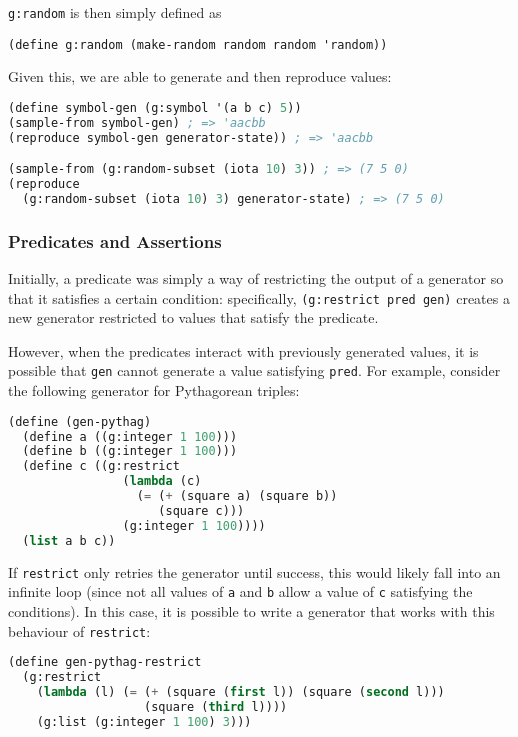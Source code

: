 \verb|g:random| is then simply defined as
\begin{lstlisting}
(define g:random (make-random random random 'random))
\end{lstlisting}

Given this, we are able to generate and then reproduce values:

\begin{lstlisting}[language=lisp]
(define symbol-gen (g:symbol '(a b c) 5))
(sample-from symbol-gen) ; => 'aacbb
(reproduce symbol-gen generator-state)) ; => 'aacbb

(sample-from (g:random-subset (iota 10) 3)) ; => (7 5 0)
(reproduce 
  (g:random-subset (iota 10) 3) generator-state) ; => (7 5 0)
\end{lstlisting}

\subsubsection{Predicates and Assertions}

Initially, a predicate was simply a way of restricting the output of a generator so that it satisfies a certain condition: specifically, \verb|(g:restrict pred gen)| creates a new generator restricted to values that satisfy the predicate.

However, when the predicates interact with previously generated values, it is possible that \verb|gen| cannot generate a value satisfying \verb|pred|. For example, consider the following generator for Pythagorean triples:

\begin{lstlisting}[language=lisp]
(define (gen-pythag)
  (define a ((g:integer 1 100)))
  (define b ((g:integer 1 100)))
  (define c ((g:restrict
                (lambda (c)
                  (= (+ (square a) (square b))
                     (square c)))
                (g:integer 1 100))))
  (list a b c))
\end{lstlisting}

If \verb|restrict| only retries the generator until success, this would likely fall into an infinite loop (since not all values of \verb|a| and \verb|b| allow a value of \verb|c| satisfying the conditions). In this case, it is possible to write a generator that works with this behaviour of \verb|restrict|:

\begin{lstlisting}[language=lisp]
(define gen-pythag-restrict
  (g:restrict
    (lambda (l) (= (+ (square (first l)) (square (second l)))
                   (square (third l))))
    (g:list (g:integer 1 100) 3)))
\end{lstlisting}

